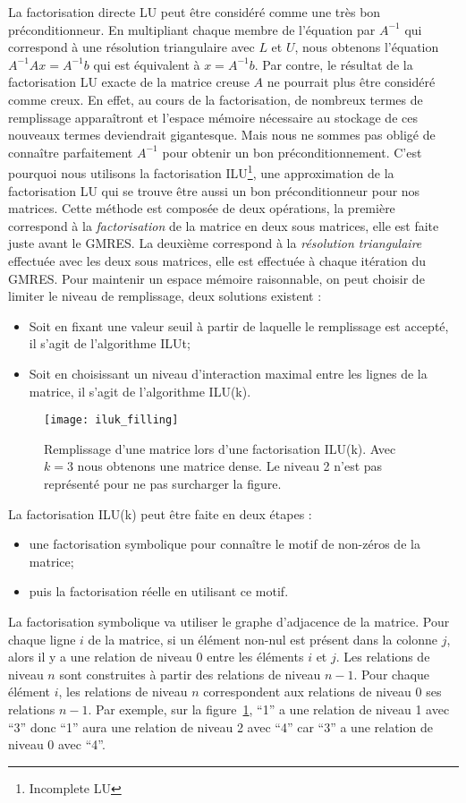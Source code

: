 La factorisation directe LU peut être considéré comme une très bon préconditionneur.
%
En multipliant chaque membre de l'équation par $A^{-1}$ qui correspond à une résolution triangulaire avec $L$ et $U$, nous obtenons l'équation $A^{-1}Ax=A^{-1}b$ qui est équivalent à $x=A^{-1}b$.
%
Par contre, le résultat de la factorisation LU exacte de la matrice creuse $A$ ne pourrait plus être considéré comme creux.
%
En effet, au cours de la factorisation, de nombreux termes de remplissage apparaîtront et l'espace mémoire nécessaire au stockage de ces nouveaux termes deviendrait gigantesque.
%
Mais nous ne sommes pas obligé de connaître parfaitement $A^{-1}$ pour obtenir un bon préconditionnement.
%
C'est pourquoi nous utilisons la factorisation ILU\footnote{Incomplete LU}, une approximation de la factorisation LU qui se trouve être aussi un bon préconditionneur pour nos matrices.
%
Cette méthode est composée de deux opérations, la première correspond à la {\em factorisation} de la matrice en deux sous matrices, elle est faite juste avant le GMRES.
%
La deuxième correspond à la {\em résolution triangulaire} effectuée avec les deux sous matrices, elle est effectuée à chaque itération du GMRES.
%
Pour maintenir un espace mémoire raisonnable, on peut choisir de limiter le niveau de remplissage, deux solutions existent :
\begin{itemize}
  \item Soit en fixant une valeur seuil à partir de laquelle le remplissage est accepté, il s'agit de l'algorithme ILUt;
  \item Soit en choisissant un niveau d'interaction maximal entre les lignes de la matrice, il s'agit de l'algorithme ILU(k).
\end{itemize}

\begin{figure}[!h]
  \centering
  \texttt{[image: iluk\_filling]}
  \caption{Remplissage d'une matrice lors d'une factorisation ILU(k). Avec $k=3$ nous obtenons une matrice dense. Le niveau 2 n'est pas représenté pour ne pas surcharger la figure.}
  \label{fig:iluk_filling}
\end{figure}


La factorisation ILU(k) peut être faite en deux étapes :
\begin{itemize}
  \item une factorisation symbolique pour connaître le motif de non-zéros de la matrice;
  \item puis la factorisation réelle en utilisant ce motif.
\end{itemize}
%
La factorisation symbolique va utiliser le graphe d'adjacence de la matrice.
%
Pour chaque ligne $i$ de la matrice, si un élément non-nul est présent dans la colonne $j$, alors il y a une relation de niveau 0 entre les éléments $i$ et $j$.
%
Les relations de niveau $n$ sont construites à partir des relations de niveau $n-1$.
%
Pour chaque élément $i$, les relations de niveau $n$ correspondent aux relations de niveau 0 ses relations $n-1$.
%
Par exemple, sur la figure~\ref{fig:iluk_filling}, ``1'' a une relation de niveau 1 avec ``3'' donc ``1'' aura une relation de niveau 2 avec ``4'' car ``3'' a une relation de niveau 0 avec ``4''.


